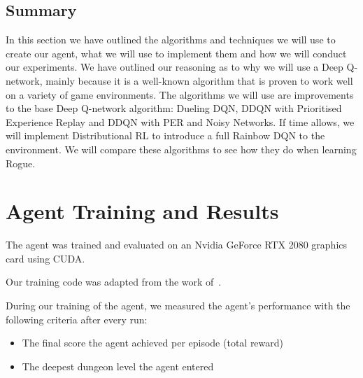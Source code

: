 \documentclass[12pt,a4paper]{article}
\begin{document}
    \subsection{Summary}\label{subsec:summary2}
    In this section we have outlined the algorithms and techniques we will use to create our agent, what we will use to implement them and how we will conduct our experiments.
    We have outlined our reasoning as to why we will use a Deep Q-network, mainly because it is a well-known algorithm that is proven to work well on a variety of game environments.
    The algorithms we will use are improvements to the base Deep Q-network algorithm: Dueling DQN, DDQN with Prioritised Experience Replay and DDQN with PER and Noisy Networks.
    If time allows, we will implement Distributional RL to introduce a full Rainbow DQN to the environment.
    We will compare these algorithms to see how they do when learning Rogue.

    \section{Agent Training and Results}\label{sec:agent-training-and-results}
    The agent was trained and evaluated on an Nvidia GeForce RTX 2080 graphics card using CUDA.

    Our training code was adapted from the work of~\citet{sebtheiler}.

    During our training of the agent, we measured the agent's performance with the following criteria after every run:

    \begin{itemize}
        \item The final score the agent achieved per episode (total reward)
        \item The deepest dungeon level the agent entered
    \end{itemize}
\end{document}
